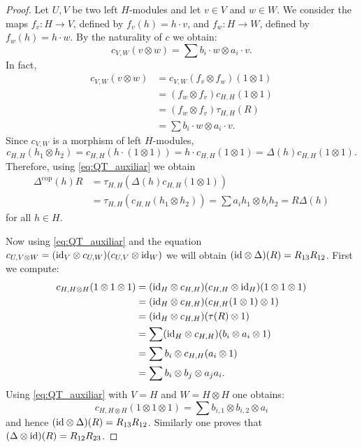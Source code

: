 \begin{proof}
Let $U,V$ be two left $H$-modules and let $v\in V$ and $w\in W$. We consider
the maps $f_v:H\to V$, defined by $f_v(h)=h\cdot v$, and $f_w:H\to W$, defined
by $f_w(h)=h\cdot w$. By the naturality of $c$ we obtain:
\begin{equation}
\label{eq:QT_auxiliar}
c_{V,W}(v\otimes w)=\sum b_{i}\cdot w\otimes a_{i}\cdot v.
\end{equation}
In fact, 
\begin{align*} 
c_{V,W}(v\otimes w) & =c_{V,W}(f_v\otimes f_w)(1\otimes1)\\
 & =(f_w\otimes f_v)c_{H,H}(1\otimes1)\\
 & =(f_w\otimes f_v)\tau_{H,H}(R)\\
 & =\sum b_{i}\cdot w\otimes a_{i}\cdot v.
\end{align*}
Since $c_{V,W}$ is a morphism of left $H$-modules, 
\[
c_{H,H}(h_1\otimes h_2)=c_{H,H}(h\cdot(1\otimes1))=h\cdot c_{H,H}(1\otimes1)=\Delta(h)c_{H,H}(1\otimes1).
\]
Therefore, using \eqref{eq:QT_auxiliar} we obtain 
\begin{align*}
\Delta^{\mathrm{cop}}(h)R &= \tau_{H,H}(\Delta(h)c_{H,H}(1\otimes1))\\
&=\tau_{H,H}(c_{H,H}(h_1\otimes h_2))=\sum a_ih_1\otimes b_ih_2=R\Delta(h)
\end{align*}
for all $h\in H$. 

Now using \eqref{eq:QT_auxiliar} and the equation $c_{U,V\otimes
W}=(\mathrm{id}_{V}\otimes c_{U,W})(c_{U,V}\otimes\mathrm{id}_{W})$ we will
obtain $(\mathrm{id}\otimes\Delta)(R)=R_{13}R_{12}$. First we compute:
\begin{align*}
c_{H,H\otimes H}(1\otimes1\otimes1) & =(\mathrm{id}_{H}\otimes c_{H,H})(c_{H,H}\otimes\mathrm{id}_{H})(1\otimes1\otimes1)\\
 & =(\mathrm{id}_{H}\otimes c_{H,H})(c_{H,H}(1\otimes1)\otimes1)\\
 & =(\mathrm{id}_{H}\otimes c_{H,H})(\tau(R)\otimes1)\\
 & =\sum(\mathrm{id}_{H}\otimes c_{H,H})(b_{i}\otimes a_{i}\otimes1)\\
 & =\sum b_{i}\otimes c_{H,H}(a_{i}\otimes1)\\
 & =\sum b_{i}\otimes b_{j}\otimes a_{j}a_{i}.
\end{align*}
Using \eqref{eq:QT_auxiliar} with $V=H$ and $W=H\otimes H$ one obtains:
\[
c_{H,H\otimes H}(1\otimes1\otimes1)=\sum b_{i,1}\otimes b_{i,2}\otimes a_{i}
\]
and hence $(\mathrm{id}\otimes\Delta)(R)=R_{13}R_{12}$.  Similarly one proves
that $(\Delta\otimes\mathrm{id})(R)=R_{12}R_{23}$. 
\end{proof}

